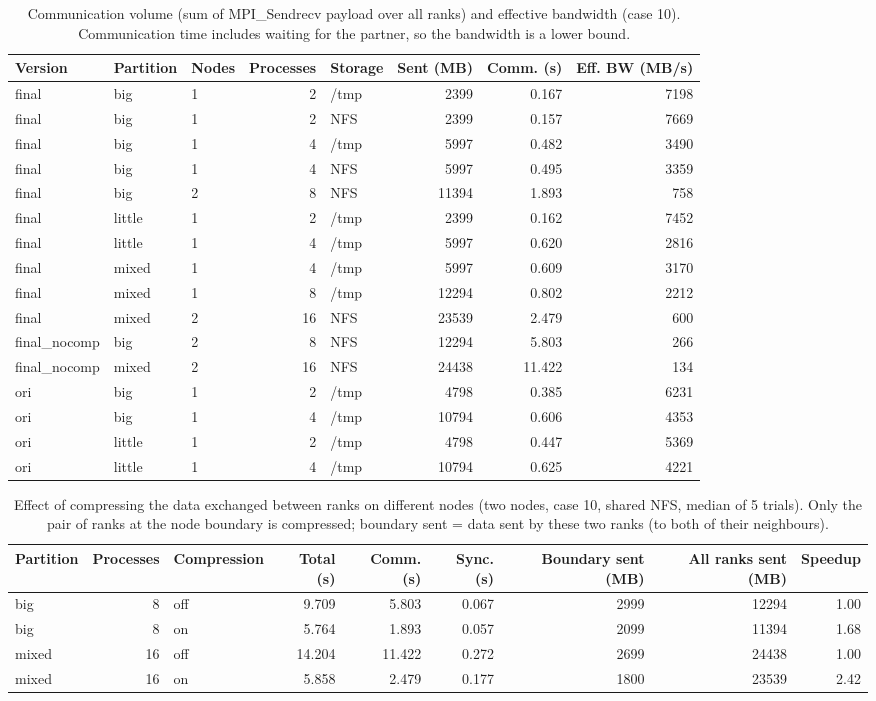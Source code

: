 \begin{table}[htbp]
\centering
\caption{Communication volume (sum of MPI\_Sendrecv payload over all ranks) and effective bandwidth (case 10). Communication time includes waiting for the partner, so the bandwidth is a lower bound.}
\label{tab:comm}
\begin{tabular}{lllrlrrr}
\toprule
Version & Partition & Nodes & Processes & Storage & Sent (MB) & Comm. (s) & Eff. BW (MB/s) \\
\midrule
final & big & 1 & 2 & /tmp & 2399 & 0.167 & 7198 \\
final & big & 1 & 2 & NFS & 2399 & 0.157 & 7669 \\
final & big & 1 & 4 & /tmp & 5997 & 0.482 & 3490 \\
final & big & 1 & 4 & NFS & 5997 & 0.495 & 3359 \\
final & big & 2 & 8 & NFS & 11394 & 1.893 & 758 \\
final & little & 1 & 2 & /tmp & 2399 & 0.162 & 7452 \\
final & little & 1 & 4 & /tmp & 5997 & 0.620 & 2816 \\
final & mixed & 1 & 4 & /tmp & 5997 & 0.609 & 3170 \\
final & mixed & 1 & 8 & /tmp & 12294 & 0.802 & 2212 \\
final & mixed & 2 & 16 & NFS & 23539 & 2.479 & 600 \\
final\_nocomp & big & 2 & 8 & NFS & 12294 & 5.803 & 266 \\
final\_nocomp & mixed & 2 & 16 & NFS & 24438 & 11.422 & 134 \\
ori & big & 1 & 2 & /tmp & 4798 & 0.385 & 6231 \\
ori & big & 1 & 4 & /tmp & 10794 & 0.606 & 4353 \\
ori & little & 1 & 2 & /tmp & 4798 & 0.447 & 5369 \\
ori & little & 1 & 4 & /tmp & 10794 & 0.625 & 4221 \\
\bottomrule
\end{tabular}
\end{table}

\begin{table}[htbp]
\centering
\caption{Effect of compressing the data exchanged between ranks on different nodes (two nodes, case 10, shared NFS, median of 5 trials). Only the pair of ranks at the node boundary is compressed; boundary sent = data sent by these two ranks (to both of their neighbours).}
\label{tab:compression}
\begin{tabular}{lrlrrrrrr}
\toprule
Partition & Processes & Compression & Total (s) & Comm. (s) & Sync. (s) & Boundary sent (MB) & All ranks sent (MB) & Speedup \\
\midrule
big & 8 & off & 9.709 & 5.803 & 0.067 & 2999 & 12294 & 1.00 \\
big & 8 & on & 5.764 & 1.893 & 0.057 & 2099 & 11394 & 1.68 \\
mixed & 16 & off & 14.204 & 11.422 & 0.272 & 2699 & 24438 & 1.00 \\
mixed & 16 & on & 5.858 & 2.479 & 0.177 & 1800 & 23539 & 2.42 \\
\bottomrule
\end{tabular}
\end{table}

